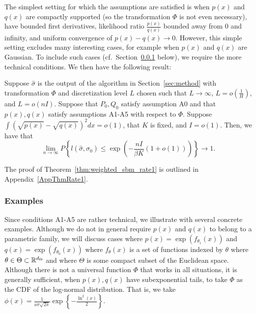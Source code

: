 \documentclass{article}
\begin{document}
The simplest setting for which the assumptions are satisfied is when $p(x)$ and $q(x)$ are compactly supported (so the transformation $\Phi$ is not even necessary), have bounded first derivatives, likelihood ratio $\frac{p(x)}{q(x)}$ bounded away from 0 and infinity, and uniform convergence of $p(x) - q(x) \rightarrow 0$. However, this simple setting excludes many interesting cases, for example when $p(x)$ and $q(x)$ are Gaussian. To include such cases (cf.\ Section~\ref{SubsecExa} below), we require the more technical conditions. We then have the following result:
\begin{theorem}
\label{thm:weighted_sbm_rate1}
Suppose $\hat{\sigma}$ is the output of the algorithm in Section~\ref{sec:method} with transformation $\Phi$ and discretization level $L$ chosen such that $L \rightarrow \infty$, $L = o(\frac{1}{H})$, and $L = o(nI)$. Suppose that $P_0, Q_0$ satisfy assumption A0 and that $p(x), q(x)$ satisfy assumptions A1-A5 with respect to $\Phi$. Suppose $\int (\sqrt{p(x)} - \sqrt{q(x)})^2 dx = o(1)$, that $K$ is fixed, and $I = o(1)$. Then, we have that
\[
\lim_{n \rightarrow \infty} P \left\{
     l(\hat{\sigma}, \sigma_0) \leq \exp\left( - \frac{nI}{\beta K} (1 + o(1)) \right)
    \right\} \rightarrow 1.
\]
\end{theorem}
The proof of Theorem~\ref{thm:weighted_sbm_rate1} is outlined in Appendix~\ref{AppThmRate1}. 

\subsubsection{Examples}
\label{SubsecExa}

Since conditions A1-A5 are rather technical, we illustrate with several concrete examples. Although we do not in general require $p(x)$ and $q(x)$ to belong to a parametric family, we will discuss cases where $p(x) = \exp( f_{\theta_1}(x))$ and $q(x) = \exp( f_{\theta_0}(x))$ where $f_{\theta}(x)$ is a set of functions indexed by $\theta$ where  $\theta \in \Theta \subset {\mathbb R}^{d_{\Theta}}$ and where $\Theta$ is some compact subset of the Euclidean space.
Although there is not a universal function $\Phi$ that works in all situations, it is generally sufficient, when $p(x), q(x)$ have subexponential tails, to take $\Phi$ as the CDF of the log-normal distribution. That is, we take $\phi(x) = \frac{1}{x \sigma \sqrt{2\pi}} \exp\left\{ - \frac{\ln^2 (x)}{2} \right\}$.
\end{document}
